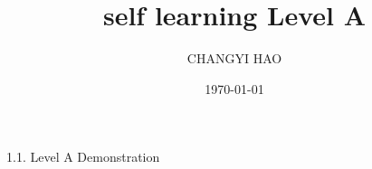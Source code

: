 \documentclass{article}
\title{self learning Level A}
\author{CHANGYI HAO}
\date{\today}
\begin{document}
1.1. Level A Demonstration
\end{document}
